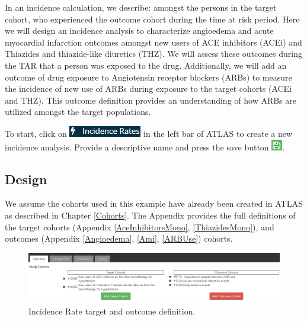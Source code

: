 \documentclass[11pt]{book}
\theoremstyle{definition}
\theoremstyle{definition}
\theoremstyle{definition}
\theoremstyle{remark}
\begin{document}
In an incidence calculation, we describe: amongst the persons in the target cohort, who experienced the outcome cohort during the time at risk period. Here we will design an incidence analysis to characterize angioedema and acute myocardial infarction outcomes amongst new users of ACE inhibitors (ACEi) and Thiazides and thiazide-like diuretics (THZ). We will assess these outcomes during the TAR that a person was exposed to the drug. Additionally, we will add an outcome of drug exposure to Angiotensin receptor blockers (ARBs) to measure the incidence of new use of ARBs during exposure to the target cohorts (ACEi and THZ). This outcome definition provides an understanding of how ARBs are utilized amongst the target populations.

To start, click on \includegraphics{images/Characterization/atlasIncidenceMenuItem.png} in the left bar of ATLAS to create a new incidence analysis. Provide a descriptive name and press the save button \includegraphics{images/PopulationLevelEstimation/save.png}.

\hypertarget{design-2}{%
\subsection{Design}\label{design-2}}

We assume the cohorts used in this example have already been created in ATLAS as described in Chapter \ref{Cohorts}. The Appendix provides the full definitions of the target cohorts (Appendix \ref{AceInhibitorsMono}, \ref{ThiazidesMono}), and outcomes (Appendix \ref{Angioedema}, \ref{Ami}, \ref{ARBUse}) cohorts.

\begin{figure}

{\centering \includegraphics[width=1\linewidth]{images/Characterization/atlasIncidenceCohortSelection} 

}

\caption{Incidence Rate target and outcome definition.}\label{fig:atlasIncidenceCohortSelection}
\end{figure}
\end{document}
